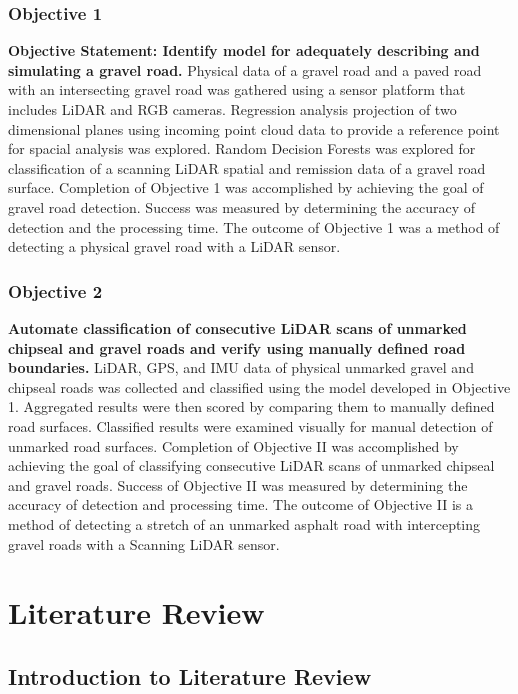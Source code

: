 \documentclass[numbered,pdftex]{ohio-etd}
\begin{document}
{	\subsection{Objective 1}
	
		{\textbf{Objective Statement: Identify model for adequately describing and simulating a gravel road.} Physical data of a gravel road and a paved road with an intersecting gravel road was gathered using a sensor platform that includes LiDAR and RGB cameras. Regression analysis projection of two dimensional planes using incoming point cloud data to provide a reference point for spacial analysis was explored. Random Decision Forests was explored for classification of a scanning LiDAR spatial and remission data of a gravel road surface. Completion of Objective 1 was accomplished by achieving the goal of gravel road detection. Success was measured by determining the accuracy of detection and the processing time. The outcome of Objective 1 was a method of detecting a physical gravel road with a LiDAR sensor.}

	\subsection{Objective 2}

		{\textbf{Automate classification of consecutive LiDAR scans of unmarked chipseal and gravel roads and verify using manually defined road boundaries.} LiDAR, GPS, and IMU data of physical unmarked gravel and chipseal roads was collected and classified using the model developed in Objective 1. Aggregated results were then scored by comparing them to manually defined road surfaces. Classified results were examined visually for manual detection of unmarked road surfaces. Completion of Objective II was accomplished by achieving the goal of classifying consecutive LiDAR scans of unmarked chipseal and gravel roads. Success of Objective II was measured by determining the accuracy of detection and processing time. The outcome of Objective II is a method of detecting a stretch of an unmarked asphalt road with intercepting gravel roads with a Scanning LiDAR sensor.}


\chapter{Literature Review}

	\section{Introduction to Literature Review}
		
}
\end{document}
